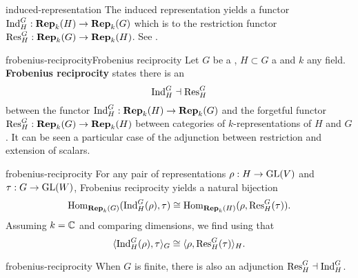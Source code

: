 \begin{example}{induced-representation}
    The induced representation yields a functor $\textup{Ind}_H^G : \textbf{Rep}_k(H) \to \textbf{Rep}_k(G)$ which is  to the restriction functor $\textup{Res}_H^G : \textbf{Rep}_k(G) \to \textbf{Rep}_k(H)$. See .
\end{example}

\begin{topic}{frobenius-reciprocity}{Frobenius reciprocity}
    Let $G$ be a , $H \subset G$ a  and $k$ any field. \textbf{Frobenius reciprocity} states there is an 
    \[ \textup{Ind}_H^G \dashv \textup{Res}_H^G \]
    between the  functor $\textup{Ind}_H^G : \textbf{Rep}_k(H) \to \textbf{Rep}_k(G)$ and the forgetful functor $\textup{Res}_H^G : \textbf{Rep}_k(G) \to \textbf{Rep}_k(H)$ between categories of $k$-representations of $H$ and $G$. It can be seen a particular case of the adjunction between restriction and extension of scalars.
\end{topic}

\begin{example}{frobenius-reciprocity}
    For any pair of representations $\rho : H \to \textup{GL}(V)$ and $\tau : G \to \textup{GL}(W)$, Frobenius reciprocity yields a natural bijection
    \[ \operatorname{Hom}_{\textbf{Rep}_k(G)}(\textup{Ind}_H^G(\rho), \tau) \cong \operatorname{Hom}_{\textbf{Rep}_k(H)}(\rho, \textup{Res}_H^G(\tau)) . \]
    Assuming $k = \mathbb{C}$ and comparing dimensions, we find using  that
    \[ \langle \textup{Ind}_H^G(\rho), \tau \rangle_G \cong \langle \rho, \textup{Res}_H^G(\tau) \rangle_H . \]
\end{example}

\begin{example}{frobenius-reciprocity}
    When $G$ is finite, there is also an adjunction $\textup{Res}_H^G \dashv \textup{Ind}_H^G$.
\end{example}

